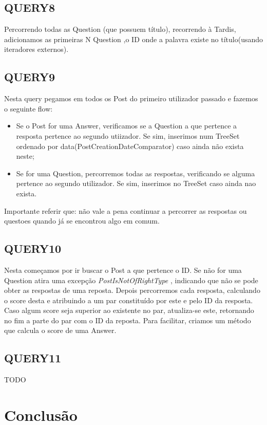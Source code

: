 \documentclass[letterpaper, 10 pt, conference]{IEEEtran} %
\begin{document}
\subsection{QUERY8}

Percorrendo todas as Question (que possuem título), recorrendo à Tardis, adicionamos as primeiras N Question ,o ID onde a palavra
existe no título(usando iteradores externos).

\subsection{QUERY9}

Nesta query pegamos em todos os Post do primeiro utilizador passado e fazemos o seguinte flow:
\begin{itemize}
    \item Se o Post for uma Answer, verificamos se a Question a que pertence a resposta pertence ao segundo utiizador. Se sim,
    inserimos num TreeSet ordenado por data(PostCreationDateComparator) caso ainda não exista neste;
    \item Se for uma Question, percorremos todas as respostas, verificando se alguma pertence ao segundo utilizador. Se sim, inserimos
    no TreeSet caso ainda nao exista.
\end{itemize}
    Importante referir que: não vale a pena continuar a percorrer as respostas ou questoes quando já se encontrou algo em comum.


\subsection{QUERY10}

Nesta começamos por ir buscar o Post a que pertence o ID. Se não for uma Question atira uma excepção \textit{PostIsNotOfRightType}
, indicando que não se pode obter as respostas de uma reposta.
Depois percorremos cada resposta, calculando o score desta e atribuindo a um par constituído por este e pelo ID da resposta.
Caso algum score seja superior ao existente no par, atualiza-se este, retornando no fim a parte do par com o ID da reposta.
Para facilitar, criamos um método que calcula o score de uma Answer.

\subsection{QUERY11}

TODO

\section{Conclusão}
\end{document}
